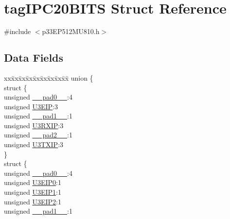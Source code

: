 \hypertarget{structtag_i_p_c20_b_i_t_s}{}\section{tag\+I\+P\+C20\+B\+I\+TS Struct Reference}
\label{structtag_i_p_c20_b_i_t_s}


{\ttfamily \#include $<$p33\+E\+P512\+M\+U810.\+h$>$}

\subsection*{Data Fields}
\begin{DoxyCompactItemize}
\item 
\begin{tabbing}
xx\=xx\=xx\=xx\=xx\=xx\=xx\=xx\=xx\=\kill
union \{\\
\>struct \{\\
\>\>unsigned \hyperlink{structtag_i_p_c20_b_i_t_s_adf71f3d8410c1f1dbbc96680a92c49af}{\_\_pad0\_\_}:4\\
\>\>unsigned \hyperlink{structtag_i_p_c20_b_i_t_s_adbe541387dfa71020beb8cee77c41d68}{U3EIP}:3\\
\>\>unsigned \hyperlink{structtag_i_p_c20_b_i_t_s_acaf2d0924a107ec6e8d2e31febaf66f9}{\_\_pad1\_\_}:1\\
\>\>unsigned \hyperlink{structtag_i_p_c20_b_i_t_s_a6855e3f3558484da00b3efc144ce5409}{U3RXIP}:3\\
\>\>unsigned \hyperlink{structtag_i_p_c20_b_i_t_s_a4d97cc5f7d51d22fc2bf3eab35c9cb7f}{\_\_pad2\_\_}:1\\
\>\>unsigned \hyperlink{structtag_i_p_c20_b_i_t_s_a8b188acf12365bea84ff094a117fb977}{U3TXIP}:3\\
\>\} \\
\>struct \{\\
\>\>unsigned \hyperlink{structtag_i_p_c20_b_i_t_s_adf71f3d8410c1f1dbbc96680a92c49af}{\_\_pad0\_\_}:4\\
\>\>unsigned \hyperlink{structtag_i_p_c20_b_i_t_s_a89165f0ed543a0ed733a6b39daa3d20b}{U3EIP0}:1\\
\>\>unsigned \hyperlink{structtag_i_p_c20_b_i_t_s_af1904c27eeefdac02aeabb64a0753afd}{U3EIP1}:1\\
\>\>unsigned \hyperlink{structtag_i_p_c20_b_i_t_s_a3e61578359560f895d31bf80e1e3a510}{U3EIP2}:1\\
\>\>unsigned \hyperlink{structtag_i_p_c20_b_i_t_s_acaf2d0924a107ec6e8d2e31febaf66f9}{\_\_pad1\_\_}:1\\

\end{tabbing}
\end{DoxyCompactItemize}
